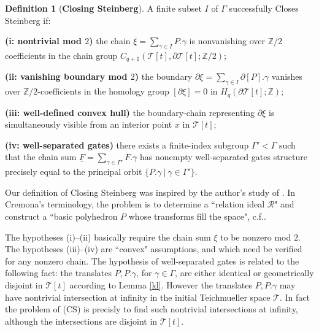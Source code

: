 \documentclass[12pt]{amsart}
\theoremstyle{definition}
\newtheorem{dfn}[thm]{Definition}
\theoremstyle{remark}
\newcommand{\bZ}{\mathbb{Z}}
\newcommand{\del}{\partial}
\newcommand{\uF}{\underline{F}}
\newcommand{\sT}{\mathscr{T}}
\begin{document}
\begin{dfn}[\textbf{Closing Steinberg}]\label{cs}
A finite subset $I$ of $\Gamma$ successfully Closes Steinberg if: 

\textbf{(i: nontrivial mod $2$)} the chain $\xi=\sum_{\gamma\in I} P.\gamma $ is nonvanishing over $\bZ/2$ coefficients in the chain group $C_{q+1}(\sT[t],\del \sT[t];\bZ/2)$;  

\textbf{(ii: vanishing boundary mod $2$)} the boundary $\del \xi=\sum_{\gamma\in I} \del [P].\gamma $
vanishes over $\bZ/2$-coefficients in the homology group $[\del \xi]=0$ in $H_q(\del \sT[t]; \bZ)$;

\textbf{(iii: well-defined convex hull)} the boundary-chain representing $\del \xi$ is simultaneously visible from an interior point $x$ in $\sT[t]$;

\textbf{(iv: well-separated gates)} there exists a finite-index subgroup $\Gamma' < \Gamma$ such that the chain sum $\uF=\sum_{\gamma \in \Gamma'}F.\gamma$ has nonempty well-separated gates structure precisely equal to the principal orbit $\{P.\gamma ~|~ \gamma\in \Gamma'\}$.
\end{dfn}

Our definition of Closing Steinberg was inspired by the author's study of \cite{Cremona}. In Cremona's terminology, the problem is to determine a ``relation ideal $\mathscr{R}$" and construct a ``basic polyhedron $P$ whose transforms fill the space", c.f.\cite[pp.290]{Cremona}. 


The hypotheses (i)--(ii) basically require the chain sum $\xi$ to be nonzero mod $2$. The hypotheses (iii)--(iv) are ``convex" assumptions, and which need be verified for any nonzero chain. The hypothesis of well-separated gates is related to the following fact: the translates $P, P.\gamma$, for $\gamma\in \Gamma$, are either identical or geometrically disjoint in $\sT[t]$ according to Lemma \ref{kl}. However the translates $P, P.\gamma$ may have nontrivial intersection at infinity in the initial Teichmueller space $\sT$. In fact the problem of (CS) is precisly to find such nontrivial intersections at infinity, although the intersections are disjoint in $\sT[t]$.
\end{document}
